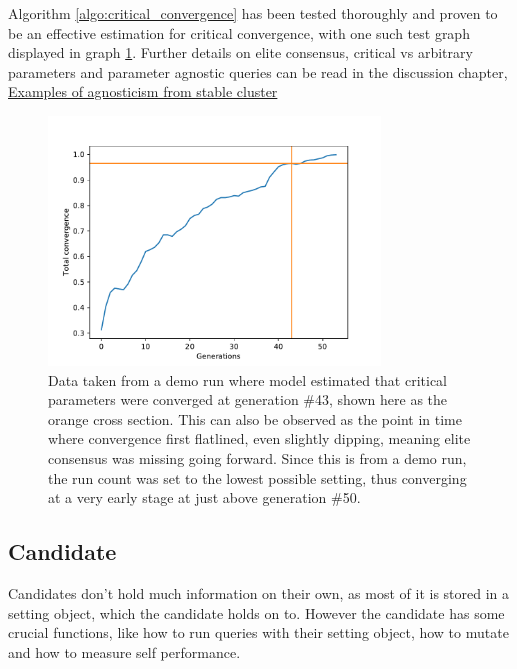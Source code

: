 \documentclass[a4paper,english]{report}
\begin{document}
		\clearpage
		Algorithm \ref{algo:critical_convergence} has been tested thoroughly and proven to be an effective estimation for critical convergence, with one such test graph displayed in graph \ref{fig:estimation}. Further details on elite consensus, critical vs arbitrary parameters and parameter agnostic queries can be read in the discussion chapter, \hyperref[sec:agnosstable]{Examples of agnosticism from stable cluster}
		\begin{figure}[H]
			\centering
			\includegraphics[width=250pt]{estimate_graph}
			\caption{Data taken from a demo run where model estimated that critical parameters were converged at generation \#43, shown here as the orange cross section. This can also be observed as the point in time where convergence first flatlined, even slightly dipping, meaning elite consensus was missing going forward. Since this is from a demo run, the run count was set to the lowest possible setting, thus converging at a very early stage at just above generation \#50.}
			\label{fig:estimation}
		\end{figure}
		\clearpage
		\subsection{Candidate}
		Candidates don't hold much information on their own, as most of it is stored in a setting object, which the candidate holds on to. However the candidate has some crucial functions, like how to run queries with their setting object, how to mutate and how to measure self performance.
\end{document}
